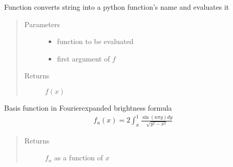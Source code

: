 \documentclass[letterpaper,10pt,english]{sphinxmanual}
\begin{document}
\begin{fulllineitems}
\label{\detokenize{diffsph.utils:diffsph.utils.tools.evaluate}}
\sphinxAtStartPar
Function converts string into a python function’s name and evaluates it
\begin{quote}\begin{description}
\item[{Parameters}] \leavevmode\begin{itemize}
\item {} 
\sphinxAtStartPar
{} \textendash{} function to be evaluated

\item {} 
\sphinxAtStartPar
{} \textendash{} first argument of \(f\)

\end{itemize}

\item[{Returns}] \leavevmode
\sphinxAtStartPar
\(f(x)\)

\end{description}\end{quote}

\end{fulllineitems}


\begin{fulllineitems}
\label{\detokenize{diffsph.utils:diffsph.utils.tools.f}}
\sphinxAtStartPar
Basis function in Fourier\sphinxhyphen{}expanded brightness formula
\begin{equation*}
\begin{split}f_n(x)=2\int_x^1\frac{\sin(n\pi y) dy}{\sqrt{y^2-x^2}}\end{split}
\end{equation*}\begin{quote}\begin{description}
\item[{Returns}] \leavevmode
\sphinxAtStartPar
\(f_n\) as a function of \(x\)

\end{description}\end{quote}

\end{fulllineitems}
\end{document}
